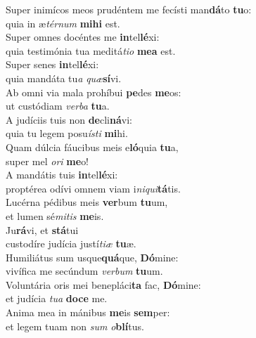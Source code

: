 \evenverse Super inimícos meos prudéntem me fecísti man\textbf{dá}to \textbf{tu}o:~\*\\
\evenverse quia in æ\textit{tér}\textit{num} \textbf{mi}\textbf{hi} est.\\
\oddverse Super omnes docéntes me \textbf{in}tel\textbf{lé}xi:~\*\\
\oddverse quia testimónia tua meditá\textit{ti}\textit{o} \textbf{me}\textbf{a} est.\\
\evenverse Super senes \textbf{in}tel\textbf{lé}xi:~\*\\
\evenverse quia mandáta tu\textit{a} \textit{quæ}\textbf{sí}vi.\\
\oddverse Ab omni via mala prohíbui \textbf{pe}des \textbf{me}os:~\*\\
\oddverse ut custódiam \textit{ver}\textit{ba} \textbf{tu}a.\\
\evenverse A judíciis tuis non \textbf{de}cli\textbf{ná}vi:~\*\\
\evenverse quia tu legem posu\textit{í}\textit{sti} \textbf{mi}hi.\\
\oddverse Quam dúlcia fáucibus meis e\textbf{ló}quia \textbf{tu}a,~\*\\
\oddverse super mel \textit{o}\textit{ri} \textbf{me}o!\\
\evenverse A mandátis tuis \textbf{in}tel\textbf{lé}xi:~\*\\
\evenverse proptérea odívi omnem viam i\textit{ni}\textit{qui}\textbf{tá}tis.\\
\oddverse Lucérna pédibus meis \textbf{ver}bum \textbf{tu}um,~\*\\
\oddverse et lumen sé\textit{mi}\textit{tis} \textbf{me}is.\\
\evenverse Ju\textbf{rá}vi, et \textbf{stá}tui~\*\\
\evenverse custodíre judícia justí\textit{ti}\textit{æ} \textbf{tu}æ.\\
\oddverse Humiliátus sum usque\textbf{quá}que, \textbf{Dó}mine:~\*\\
\oddverse vivífica me secúndum \textit{ver}\textit{bum} \textbf{tu}um.\\
\evenverse Voluntária oris mei benepláci\textbf{ta} fac, \textbf{Dó}mine:~\*\\
\evenverse et judícia \textit{tu}\textit{a} \textbf{do}\textbf{ce} me.\\
\oddverse Anima mea in mánibus \textbf{me}is \textbf{sem}per:~\*\\
\oddverse et legem tuam non \textit{sum} \textit{o}\textbf{blí}tus.\\
